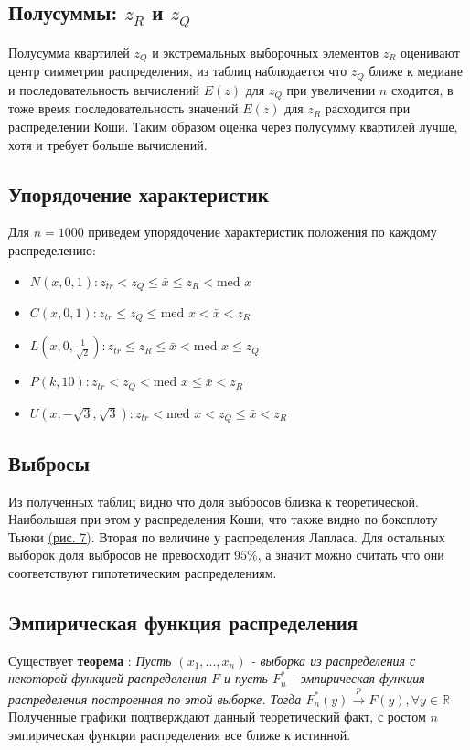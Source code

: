 \documentclass[12pt,a4paper]{article}
\begin{document}
\subsection{Полусуммы: $z_R$ и $z_Q$}
Полусумма квартилей $z_Q$ и экстремальных выборочных элементов $z_R$ оценивают центр симметрии распределения, из таблиц наблюдается что $z_Q$ ближе к медиане и последовательность вычислений $E(z) \text{ для } z_Q$ при увеличении $n$ сходится, в тоже время последовательность значений $E(z) \text{ для } z_R$ расходится при распределении Коши. Таким образом оценка через полусумму квартилей лучше, хотя и требует больше вычислений.

\subsection{Упорядочение характеристик}
Для $n=1000$ приведем упорядочение характеристик положения по каждому распределению:
\begin{itemize}
	\item $N(x, 0, 1): z_{tr} < z_Q \leq \bar x \leq z_R < \text{med }x$
	\item $C(x, 0, 1): z_{tr} \leq z_Q \leq \text{med }x < \bar x < z_R$
	\item $L(x, 0, \frac{1}{\sqrt{2}}): z_{tr} \leq z_R \leq \bar x < \text{med }x \leq z_Q$
	\item $P(k, 10): z_{tr} < z_Q < \text{med }x \leq \bar x < z_R$
	\item $U(x, -\sqrt{3}, \sqrt{3}): z_{tr} < \text{med }x < z_Q \leq \bar x < z_R$
\end{itemize}

\subsection{Выбросы}
Из полученных таблиц видно что доля выбросов близка к теоретической. Наибольшая при этом у распределения Коши, что также видно по боксплоту Тьюки \hyperref[fig:image:cauchy]{(рис. 7)}. Вторая по величине у распределения Лапласа. Для остальных выборок доля выбросов не превосходит $95\%$, а значит можно считать что они соответствуют гипотетическим распределениям.

\subsection{Эмпирическая функция распределения}
Существует \textbf{теорема} \cite{chernova}: \textit{Пусть $(x_1, ..., x_n)$ - выборка из распределения с некоторой функцией распределения $F$ и пусть $F_n^*$ - эмпирическая функция распределения построенная по этой выборке. Тогда $F_n^*(y) \overset{p}{\to} F(y), \forall y \in \mathbb{R}$} Полученные графики подтверждают данный теоретический факт, с ростом $n$ эмпирическая функцяи распределения все ближе к истинной. 
\end{document}
